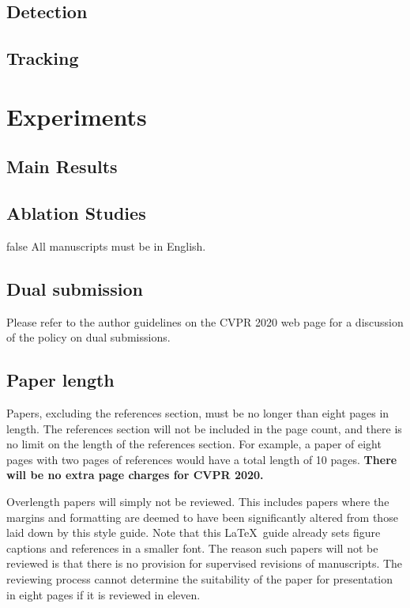 \documentclass[10pt,twocolumn,letterpaper]{article}
\begin{document}
\subsection{Detection}

\subsection{Tracking}


\section{Experiments}
\subsection{Main Results}
\subsection{Ablation Studies}

\if false
All manuscripts must be in English.

\subsection{Dual submission}

Please refer to the author guidelines on the CVPR 2020 web page for a
discussion of the policy on dual submissions.

\subsection{Paper length}
Papers, excluding the references section,
must be no longer than eight pages in length. The references section
will not be included in the page count, and there is no limit on the
length of the references section. For example, a paper of eight pages
with two pages of references would have a total length of 10 pages.
{\bf There will be no extra page charges for CVPR 2020.}

Overlength papers will simply not be reviewed.  This includes papers
where the margins and formatting are deemed to have been significantly
altered from those laid down by this style guide.  Note that this
\LaTeX\ guide already sets figure captions and references in a smaller font.
The reason such papers will not be reviewed is that there is no provision for
supervised revisions of manuscripts.  The reviewing process cannot determine
the suitability of the paper for presentation in eight pages if it is
reviewed in eleven.  
\end{document}
